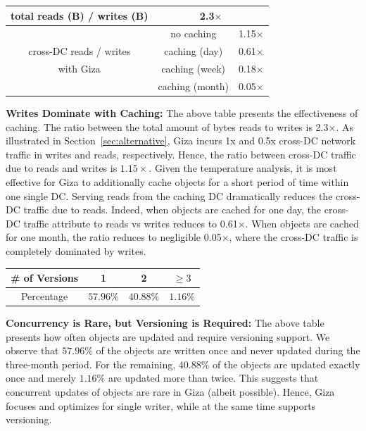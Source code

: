 \begin{table}[h]
\footnotesize
\centering
\begin{tabular}{|c||c|c|}
\hline \hline
total reads (B) / writes (B) 	& \multicolumn{2}{c|}{2.3$\times$}
\\ \hline \hline
	& no caching		& 1.15$\times$
\\ \cline{2-3}
cross-DC reads / writes
	& caching (day)		& 0.61$\times$ 
\\ \cline{2-3}
with Giza
	& caching (week)	& 0.18$\times$ 
\\ \cline{2-3}
	& caching (month)	& 0.05$\times$ 
\\ \hline \hline
\end{tabular}
\label{tab:caching}
\end{table}
{\bf Writes Dominate with Caching:} The above table presents the effectiveness of caching. The ratio between the total amount of bytes reads to writes is 2.3$\times$. 
As illustrated in Section~\ref{sec:alternative}, Giza incurs 1x and 0.5x cross-DC network traffic in writes and reads, respectively. Hence, the ratio between cross-DC traffic due to reads and writes is $1.15\times$. Given the temperature analysis, it is most effective for Giza to additionally cache  objects for a short period of time within one single DC. Serving reads from the caching DC dramatically reduces the cross-DC traffic due to reads. Indeed, when objects are cached for one day, the cross-DC traffic attribute to reads vs writes reduces to 0.61$\times$. When objects are cached for one month, the ratio reduces to negligible 0.05$\times$, where the cross-DC traffic is completely dominated by writes.

\begin{table}[h]
\footnotesize
\centering
\begin{tabular}{c||c|c|c}
\# of Versions 	& 	1				& 2					& $\ge 3$
\\ \hline
Percentage			& $57.96\%$	& $40.88\%$	& $1.16\%$
\end{tabular}
\label{tab:version}
\end{table}
{\bf Concurrency is Rare, but Versioning is Required:} The above table presents how often objects are updated and require versioning support. We observe that $57.96\%$ of the objects are written once and never updated during the three-month period. For the remaining, $40.88\%$ of the objects are updated exactly once and merely $1.16\%$ are updated more than twice. This suggests that concurrent updates of objects are rare in Giza (albeit possible). Hence, Giza focuses and optimizes for single writer, while at the same time supports versioning. 

